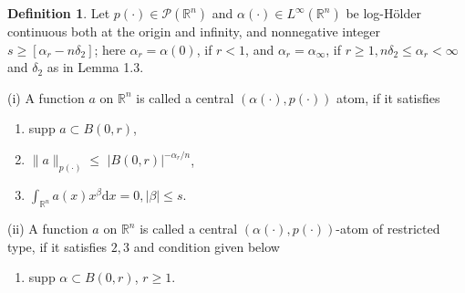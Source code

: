 \documentclass[oneside,reqno]{amsart}
\numberwithin{equation}{section}
\theoremstyle{definition}
\newtheorem{defn}[theorem]{Definition}
\begin{document}
\begin{defn}
    

Let $p(\cdot) \in \mathcal{P}\left(\mathbb{R}^{n}\right)$ and $\alpha(\cdot) \in L^{\infty}\left(\mathbb{R}^{n}\right)$ be log-H\"older continuous both at the origin and infinity, and nonnegative integer $s \geqslant\left[\alpha_{r}-n \delta_{2}\right]$; here $\alpha_{r}=\alpha(0)$, if $r<1$, and $\alpha_{r}=\alpha_{\infty}$, if $r \geqslant 1, n \delta_{2} \leq  \alpha_{r}<\infty$ and $\delta_{2}$ as in Lemma 1.3.

(i) A function $a$ on $\mathbb{R}^{n}$ is called a central $(\alpha(\cdot), p(\cdot))$ atom, if it satisfies

\begin{enumerate}
    \item [(1)]  supp $a \subset B(0, r)$,
    \item [(2) ] $\|a\|_{{p(\cdot)}} \leq $ $|B(0, r)|^{-\alpha_{r} / n} $,
    \item [(3)] $\int_{\mathbb{R}^{n}} a(x) x^{\beta} \mathrm{d} x=0,|\beta| \leq  s$.
\end{enumerate}

(ii)  A function $a$ on $\mathbb{R}^{n}$ is called a central $(\alpha(\cdot), p(\cdot))$-atom of restricted type, if it satisfies $2,3$ and condition given below

\begin{enumerate}
    \item [(a)]supp $\alpha \subset B(0, r)$, $r \geqslant 1$.
\end{enumerate}
 
\end{defn}
\end{document}
